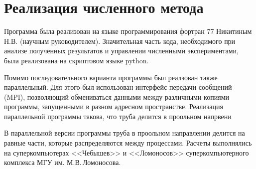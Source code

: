 \section{Реализация численного метода}



Программа была реализован на языке программирования фортран 77 Никитиным Н.В. (научным руководителем). Значительная часть кода, необходимого при анализе полученных результатов и управлении численными экспериментами, была реализована на скриптовом языке python. 


Помимо последовательного варианта программы был реалзован также параллельный. Для этого был использован интерфейс передачи сообщений (MPI), позволяющий обмениваться данными между различными копиями программы, запущенными в разном адресном пространстве. Реализация параллельной программы такова, что труба делится в проольном напрвени

В параллельной версии программы труба в проольном направлении делится на равные части, которые распределяются между процессами. Расчеты выполнялись на суперкомпьютерах <<Чебышев>> и <<Ломоносов>> суперкомпьютерного комплекса МГУ им. М.В.\,Ломоносова. 



